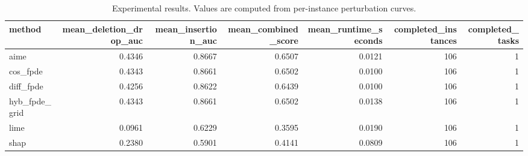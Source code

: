 \begin{table}[t]
\caption{Experimental results. Values are computed from per-instance perturbation curves.}
\label{tab:main_results_computed}
\centering
\begin{tabular}{lrrrrrr}
\toprule
method & mean\_deletion\_drop\_auc & mean\_insertion\_auc & mean\_combined\_score & mean\_runtime\_seconds & completed\_instances & completed\_tasks \\
\midrule
aime & 0.4346 & 0.8667 & 0.6507 & 0.0121 & 106 & 1 \\
cos\_fpde & 0.4343 & 0.8661 & 0.6502 & 0.0100 & 106 & 1 \\
diff\_fpde & 0.4256 & 0.8622 & 0.6439 & 0.0100 & 106 & 1 \\
hyb\_fpde\_grid & 0.4343 & 0.8661 & 0.6502 & 0.0138 & 106 & 1 \\
lime & 0.0961 & 0.6229 & 0.3595 & 0.0190 & 106 & 1 \\
shap & 0.2380 & 0.5901 & 0.4141 & 0.0809 & 106 & 1 \\
\bottomrule
\end{tabular}

\end{table}
